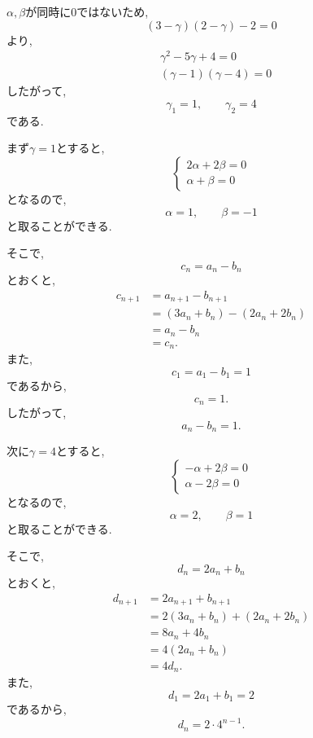 \begin{enumerate}[label=(\arabic*),parsep=3pt]
        $\alpha,\beta$が同時に$0$ではないため,
        \[
          (3-\gamma)(2-\gamma)-2=0
        \]
        より,
        \begin{align*}
          &\gamma^2-5\gamma+4=0\\
          &(\gamma-1)(\gamma-4)=0
        \end{align*}
        したがって,
        \[
          \gamma_1=1,\qquad\gamma_2=4
        \]
        である.

        まず$\gamma=1$とすると,
        \[
          \begin{cases}
            2\alpha+2\beta=0 \\
            \alpha+\beta=0
          \end{cases}
        \]
        となるので,
        \[
          \alpha=1,\qquad\beta=-1
        \]
        と取ることができる.

        そこで,
        \[
          c_n=a_n-b_n
        \]
        とおくと,
        \begin{align*}
          c_{n+1}
           & =a_{n+1}-b_{n+1}        \\
           & =(3a_n+b_n)-(2a_n+2b_n) \\
           & =a_n-b_n                \\
           & =c_n.
        \end{align*}
        また,
        \[
          c_1=a_1-b_1=1
        \]
        であるから,
        \[
          c_n=1.
        \]
        したがって,
        \[
          a_n-b_n=1.
        \]

        次に$\gamma=4$とすると,
        \[
          \begin{cases}
            -\alpha+2\beta=0 \\
            \alpha-2\beta=0
          \end{cases}
        \]
        となるので,
        \[
          \alpha=2,\qquad\beta=1
        \]
        と取ることができる.

        そこで,
        \[
          d_n=2a_n+b_n
        \]
        とおくと,
        \begin{align*}
          d_{n+1}
           & =2a_{n+1}+b_{n+1}        \\
           & =2(3a_n+b_n)+(2a_n+2b_n) \\
           & =8a_n+4b_n               \\
           & =4(2a_n+b_n)             \\
           & =4d_n.
        \end{align*}
        また,
        \[
          d_1=2a_1+b_1=2
        \]
        であるから,
        \[
          d_n=2\cdot4^{n-1}.
        \]


\end{enumerate}

